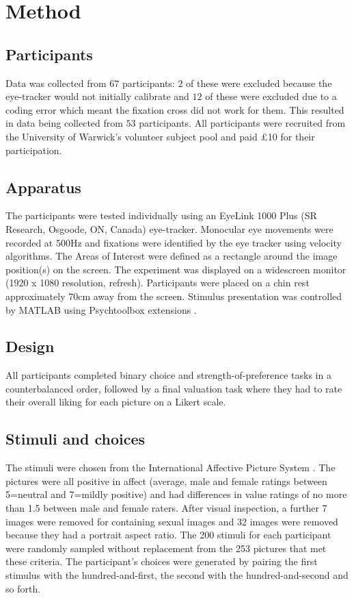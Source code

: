 \documentclass[12pt]{article}
\begin{document}
\section{Method}
\subsection{Participants}

Data was collected from $67$ participants: $2$ of these were excluded because the eye-tracker would not initially calibrate and $12$ of these were excluded due to a coding error which meant the fixation cross did not work for them. This resulted in data being collected from $53$ participants. All participants were recruited from the University of Warwick’s volunteer subject pool and paid £10 for their participation.

\subsection{Apparatus}
The participants were tested individually using an EyeLink 1000 Plus (SR Research, Osgoode, ON, Canada) eye-tracker. Monocular eye movements were recorded at 500Hz and fixations were identified by the eye tracker using velocity algorithms. The Areas of Interest were defined as a rectangle around the image position(s) on the screen. The experiment was displayed on a widescreen monitor (1920 x 1080 resolution, refresh). Participants were placed on a chin rest approximately 70cm away from the screen. Stimulus presentation was controlled by MATLAB using Psychtoolbox extensions \cite{Brainard1997, Pelli1997}.

\subsection{Design}
All participants completed binary choice and strength-of-preference tasks in a counterbalanced order, followed by a final valuation task where they had to rate their overall liking for each picture on a Likert scale. 

\subsection{Stimuli and choices}
The stimuli were chosen from the International Affective Picture System \cite{Lang:2008}. The pictures were all positive in affect (average, male and female ratings between 5=neutral and 7=mildly positive) and had differences in value ratings of no more than 1.5 between male and female raters. After visual inspection, a further 7 images were removed for containing sexual images and 32 images were removed because they had a portrait aspect ratio. The 200 stimuli for each participant were randomly sampled without replacement from the 253 pictures that met these criteria. The participant's choices were generated by pairing the first stimulus with the hundred-and-first, the second with the hundred-and-second and so forth. 
\end{document}
